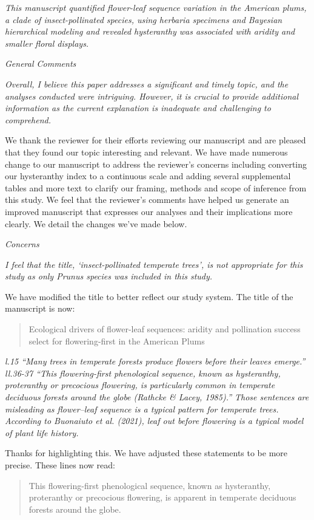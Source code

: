 \documentclass{article}[12pt]
\begin{document}
\emph{This manuscript quantified flower-leaf sequence variation in the American plums, a clade of insect-pollinated species, using herbaria specimens and Bayesian hierarchical modeling and revealed hysteranthy was associated with aridity and smaller floral displays.}

\emph{General Comments}

\emph{Overall, I believe this paper addresses a significant and timely topic, and the analyses conducted were intriguing. However, it is crucial to provide additional information as the current explanation is inadequate and challenging to comprehend.}

We thank the reviewer for their efforts reviewing our manuscript and are pleased that they found our topic interesting and relevant. We have made numerous change to our manuscript to address the reviewer's concerns including converting our hysteranthy index to a continuous scale and adding several supplemental tables and more text to clarify our framing, methods and scope of inference from this study. We feel that the reviewer's comments have helped us generate an improved manuscript that expresses our analyses and their implications more clearly. We detail the changes we've made below.

\emph{Concerns}

\emph{I feel that the title, ‘insect-pollinated temperate trees’, is not appropriate for this study as only Prunus species was included in this study.}

We have modified the title to better reflect our study system. The title of the manuscript is now: 
\begin{quote}Ecological drivers of flower-leaf sequences: aridity and pollination success select for flowering-first in the American Plums \end{quote}

\emph{l.15 “Many trees in temperate forests produce flowers before their leaves emerge.”
ll.36-37 “This flowering-first phenological sequence, known as hysteranthy, proteranthy or precocious flowering, is particularly common in temperate deciduous forests around the globe (Rathcke & Lacey, 1985).”
Those sentences are misleading as flower–leaf sequence is a typical pattern for temperate trees. According to Buonaiuto et al. (2021), leaf out before flowering is a typical model of plant life history.}

Thanks for highlighting this. We have adjusted these statements to be more precise. These lines now read:
\begin{quote} This flowering-first phenological sequence, known as hysteranthy, proteranthy or precocious flowering, is apparent in temperate deciduous forests around the globe. \end{quote}
\end{document}

